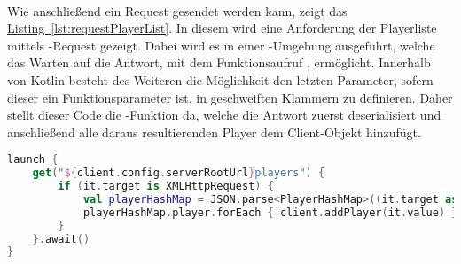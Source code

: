 \\
Wie anschließend ein Request gesendet werden kann, zeigt das \hyperref[lst:requestPlayerList]{Listing~\ref{lst:requestPlayerList}}. In diesem wird eine Anforderung der Playerliste mittels -Request gezeigt. Dabei wird es in einer -Umgebung ausgeführt, welche das Warten auf die Antwort, mit dem Funktionsaufruf , ermöglicht. Innerhalb von Kotlin besteht des Weiteren die Möglichkeit den letzten Parameter, sofern dieser ein Funktionsparameter ist, in geschweiften Klammern zu definieren. Daher stellt dieser Code die -Funktion da, welche die Antwort zuerst deserialisiert und anschließend alle daraus resultierenden Player dem Client-Objekt hinzufügt.
\begin{lstlisting}[style=lstStyleFramed, language=Kotlin, caption={Funktionsaufruf eines \code{GET}-Requestes am Beispiel der Playerliste}, label=lst:requestPlayerList, float]
launch {
	get("${client.config.serverRootUrl}players") {
		if (it.target is XMLHttpRequest) {
			val playerHashMap = JSON.parse<PlayerHashMap>((it.target as XMLHttpRequest).responseText)
			playerHashMap.player.forEach { client.addPlayer(it.value) }
		}
	}.await()
}
\end{lstlisting}

